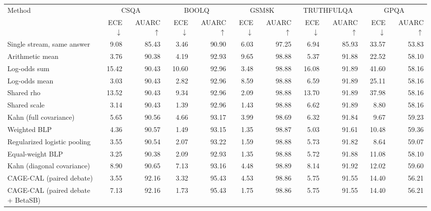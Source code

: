 \begin{tabular}{lrrrrrrrrrr}
\toprule
Method & \multicolumn{2}{c}{CSQA} & \multicolumn{2}{c}{BOOLQ} & \multicolumn{2}{c}{GSM8K} & \multicolumn{2}{c}{TRUTHFULQA} & \multicolumn{2}{c}{GPQA} \\
 & ECE $\downarrow$ & AUARC $\uparrow$ & ECE $\downarrow$ & AUARC $\uparrow$ & ECE $\downarrow$ & AUARC $\uparrow$ & ECE $\downarrow$ & AUARC $\uparrow$ & ECE $\downarrow$ & AUARC $\uparrow$ \\
\midrule
Single stream, same answer & 9.08 & 85.43 & 3.46 & 90.90 & 6.03 & 97.25 & 6.94 & 85.93 & 33.57 & 53.83 \\
Arithmetic mean & 3.76 & 90.38 & 4.19 & 92.93 & 9.65 & 98.88 & 5.37 & 91.88 & 22.52 & 58.10 \\
Log-odds sum & 15.42 & 90.43 & 10.60 & 92.96 & 3.48 & 98.88 & 16.08 & 91.89 & 41.60 & 58.16 \\
Log-odds mean & 3.03 & 90.43 & 2.82 & 92.96 & 8.59 & 98.88 & 6.59 & 91.89 & 25.11 & 58.16 \\
Shared rho & 13.52 & 90.43 & 9.34 & 92.96 & 2.09 & 98.88 & 13.70 & 91.89 & 37.98 & 58.16 \\
Shared scale & 3.14 & 90.43 & 1.39 & 92.96 & 1.43 & 98.88 & 6.62 & 91.89 & 8.80 & 58.16 \\
Kahn (full covariance) & 5.65 & 90.56 & 4.66 & 93.17 & 3.99 & 98.69 & 6.32 & 91.84 & 9.67 & 59.23 \\
Weighted BLP & 4.36 & 90.57 & 1.49 & 93.15 & 1.35 & 98.87 & 5.03 & 91.61 & 10.48 & 59.36 \\
Regularized logistic pooling & 3.55 & 90.54 & 2.07 & 93.22 & 1.59 & 98.88 & 5.73 & 91.82 & 8.64 & 59.07 \\
Equal-weight BLP & 3.25 & 90.38 & 2.09 & 92.93 & 1.35 & 98.88 & 5.72 & 91.88 & 11.08 & 58.10 \\
Kahn (diagonal covariance) & 8.90 & 90.65 & 7.13 & 93.16 & 4.48 & 98.89 & 8.14 & 91.92 & 12.02 & 59.60 \\
CAGE-CAL (paired debate) & 3.55 & 92.16 & 3.32 & 95.43 & 4.53 & 98.86 & 5.75 & 91.55 & 14.40 & 56.21 \\
CAGE-CAL (paired debate + BetaSB) & 7.13 & 92.16 & 1.73 & 95.43 & 1.75 & 98.86 & 5.75 & 91.55 & 14.40 & 56.21 \\
\bottomrule
\end{tabular}
